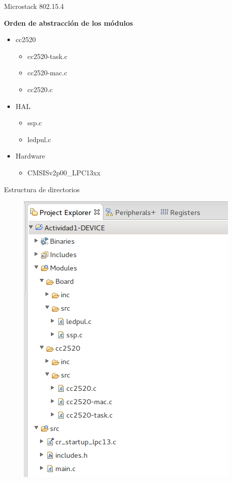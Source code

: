 \documentclass[aspectratio=169,handout]{beamer}
\begin{document}
\begin{frame}[t]{Microstack 802.15.4}

\textbf{Orden de abstracción de los módulos}
\vspace{10px}
	\begin{itemize}
	\item cc2520
		\begin{itemize}
			\item cc2520-task.c
			\item cc2520-mac.c
			\item cc2520.c
		\end{itemize}	
	\vspace{10px}
	\item HAL
		\begin{itemize}
			\item ssp.c
			\item ledpul.c
		\end{itemize}
	\vspace{10px}
	\item Hardware
		\begin{itemize}
			\item CMSISv2p00{\_}LPC13xx
		\end{itemize}
	\end{itemize}
\end{frame}

\begin{frame}[t]{Estructura de directorios}
\vspace{-15px}
	\begin{figure}[H]
		\includegraphics[height=\textheight]{./imagenes/ProjectExplorer}
	\end{figure}
\end{frame}
\end{document}
